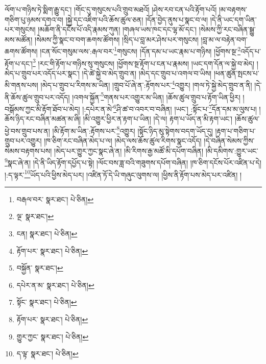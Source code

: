 ལོག་པ་གཉིས་ཏེ་སྨིག་རྒྱུ་དང་། །གོང་དུ་གསུངས་པའི་གྲུབ་མཐའོ། །ཤེས་རབ་ངན་པའི་རྟོག་པའོ། །མ་བརྟགས་གཅིག་པུ་ཉམས་དགའ་བ། །སྐྱེ་དང་འཇིག་པའི་ཆོས་ཚུལ་ཅན། །དོན་བྱེད་ནུས་པ་སྣང་བ་ལ། །དེ་ནི་ཡང་དག་ཡིན་པར་གསུངས། །མཆོག་ནི་དངོས་པོ་འདི་རྣམས་ཀུན། །གཞལ་ཡས་ཁང་དང་ལྷ་མོ་དང་། །སེམས་ཀྱི་རང་བཞིན་སྒྱུ་མས་མཚོན། །སེམས་ཀྱི་སྣང་བ་བག་ཆགས་ཚོགས། །སྲིད་པ་བླ་མར་ཤེས་པར་གསུངས། །བླ་མ་ལ་བརྟེན་བག་ཆགས་ཚོགས། །ངན་སོང་གསུམ་ལས་:རྒལ་བར་\footnote{བརྒལ་བར་  སྣར་ཐང་།  པེ་ཅིན། }གསུངས། །དོན་དམ་པ་ཡང་རྣམ་པ་གཉིས། །ཕྱོགས་སྔ་\footnote{ལྔ་  སྣར་ཐང་། }འདོད་པ་རྟོག་པ་དང་།\footnote{ངན།  སྣར་ཐང་།  པེ་ཅིན། } །རང་གི་རྟོག་པ་གཉིས་སུ་གསུངས། །ཕྱོགས་སྔ་རྟོག་པ་ངན་པ་རྣམས། །ཡང་དག་དོན་ལ་སྐྱེ་བ་མེད། །མེད་པ་གྲུབ་པར་འདོད་པར་སྣང་། །དེ་ཚེ་སྐྱེ་བ་མེད་གྲུབ་ན། །མེད་དང་གྲུབ་པ་འགལ་བ་ཡིས། །ཕན་ཚུན་སྤངས་པ་མི་གནས་པས། །མེད་པ་གྲུབ་པ་རིགས་མ་ཡིན། །གྲུབ་པོ་ཞེ་ན་:རྟོགས་པར་\footnote{རྟོག་པར་  སྣར་ཐང་།  པེ་ཅིན། }འགྱུར། །གལ་ཏེ་སྐྱེ་མེད་གྲུབ་ན་ནི། །དེ་ནི་ཆོས་ཚུལ་གྲུབ་པར་འདོད། །འགལ་སྐྱོན་\footnote{བསྐྱོན་  སྣར་ཐང་། }གནས་པར་འགྱུར་མ་ཡིན། །ཆོས་ཚུལ་གྲུབ་པ་རྟོག་ཡིན་ཕྱིར། །བསྒོམས་ཀྱང་མི་རྟོག་ཐོབ་པ་མེད། །:དཔེར་ན་མེ་\footnote{དཔེར་ན་མ་  སྣར་ཐང་།  པེ་ཅིན། }ཤི་ཚ་བ་འབར་བ་བཞིན། །ཡང་། :སྟོང་པ་\footnote{སྟོང་  སྣར་ཐང་།  པེ་ཅིན། }དོན་དམ་མ་ལུས་པ། །ཆོས་ཉིད་རང་བཞིན་མཚན་མ་ཞི། །མི་འགྱུར་ཕྱིར་ན་རྟག་པ་ཡིན། །དེ་ལ། རྟག་པ་ཡོད་ན་མི་རྟག་ཡང་། །ཆོས་ཚུལ་ཕྱེ་བས་གྲུབ་པས་ན། །མི་རྟོག་མ་ཡིན་:རྟོགས་པར་\footnote{རྟོག་པར་  སྣར་ཐང་།  པེ་ཅིན། }འགྱུར། །སྟོང་ཉིད་མུ་སྟེགས་བདག་ཡོད་དུ། །རྟག་པ་གཅིག་པ་གྲུབ་པར་འགྱུར། །ཁ་ཅིག་རང་བཞིན་མེད་པ་ལ། །མེད་ལས་ཆོས་ཚུལ་རིགས་སྣང་འདོད། །དེ་བཞིན་སེམས་ཀྱིས་སེམས་བརྟགས་པས། །མེད་པར་གྱུར་ཀྱང་སྣང་ཞེ་ན། །མི་རིགས་རྒྱ་མཚོ་མི་དཔོག་བཞིན། །མི་དམིགས་:གྱུར་ཡང་\footnote{གྱུར་ཀྱང་  སྣར་ཐང་།  པེ་ཅིན། }སྣང་ཞེ་ན། །དེ་ནི་ཡིད་རྟོག་དཔྱོད་པ་སྟེ། །ལོང་བས་ཟླ་བའི་གཟུགས་དཔོག་བཞིན། །ཁ་ཅིག་དངོས་པོར་འཛིན་པ་དེ། །:ད་ལྟར་\footnote{ད་ལྟ་  སྣར་ཐང་།  པེ་ཅིན། }ཡོད་པའི་ཕྱིས་མེད་པར། །འཛིན་ཏོ་དེ་ཡི་གཞུང་ལུགས་ལ། །ཕྱིས་ནི་རྟོག་པས་མེད་པར་འཛིན། །
